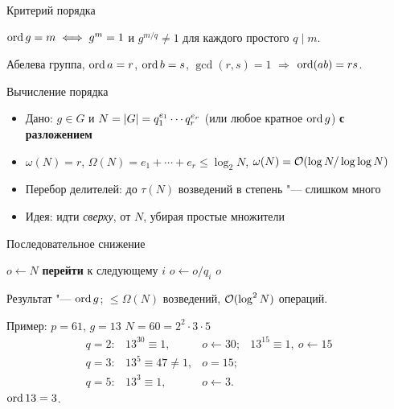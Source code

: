 \documentclass{ca-slides}
\begin{document}
\begin{canvasframe}{Критерий порядка}
  \begin{lemma}
    $\operatorname{ord} g = m \iff g^m = 1$ и $g^{m/q} \ne 1$ для каждого простого $q \mid m$.
  \end{lemma}
  \begin{lemma}
    Абелева группа, $\operatorname{ord} a = r$, $\operatorname{ord} b = s$, $\gcd(r, s) = 1$ $\Rightarrow$ $\operatorname{ord}(ab) = rs$.
  \end{lemma}
\end{canvasframe}

\begin{canvasframe}{Вычисление порядка}
  \begin{itemize}
    \item Дано: $g \in G$ и $N = \lvert G\rvert = q_1^{e_1} \cdots q_r^{e_r}$ (или любое кратное
      $\operatorname{ord} g$) \textbf{с разложением}
    \item $\omega(N) = r$, $\Omega(N) = e_1 + \cdots + e_r \le \log_2 N$,
      $\omega(N) = \mathcal{O}(\log N / \log\log N)$
    \item Перебор делителей: до $\tau(N)$ возведений в степень "--- слишком много
    \item Идея: идти \emph{сверху}, от $N$, убирая простые множители
  \end{itemize}
  \penspace[0.25\textheight]
\end{canvasframe}

\begin{canvasframe}{Последовательное снижение}
  \small
  \begin{algorithm}
  \begin{algorithmic}[1]
    \State $o \gets N$
         \textbf{перейти} к следующему $i$ \EndIf
        \State $o \gets o / q_i$
      \EndFor
    \EndFor
    \State \Return $o$
  \end{algorithmic}
  \end{algorithm}
  \begin{theorem}
    Результат "--- $\operatorname{ord} g$; $\le \Omega(N)$ возведений, $\mathcal{O}(\log^2 N)$ операций.
  \end{theorem}
\end{canvasframe}

\begin{canvasframe}{Пример: $p = 61$, $g = 13$}
  $N = 60 = 2^2 \cdot 3 \cdot 5$
  \[
  \begin{array}{llll}
    q = 2: & 13^{30} \equiv 1, & o \gets 30; & 13^{15} \equiv 1, \ o \gets 15\\
    q = 3: & 13^{5} \equiv 47 \ne 1, & o = 15; & \\
    q = 5: & 13^{3} \equiv 1, & o \gets 3. &
  \end{array}
  \]
  $\operatorname{ord} 13 = 3$.
  \penspace[0.35\textheight]
\end{canvasframe}
\end{document}
